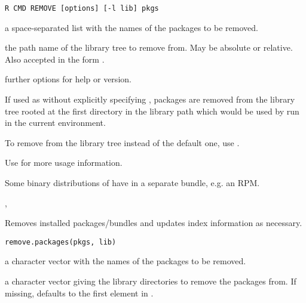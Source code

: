 %
\begin{Usage}
\begin{verbatim}
R CMD REMOVE [options] [-l lib] pkgs
\end{verbatim}
\end{Usage}
%
\begin{Arguments}
\begin{ldescription}
\item[\code{pkgs}] a space-separated list with the names of the packages to
be removed.
\item[\code{lib}] the path name of the \R{} library tree to remove from.  May
be absolute or relative.  Also accepted in the form .
\item[\code{options}] further options for help or version.
\end{ldescription}
\end{Arguments}
%
\begin{Details}\relax
If used as  without explicitly specifying
, packages are removed from the library tree rooted at the
first directory in the library path which would be used by \R{} run in
the current environment.

To remove from the library tree  instead of the default
one, use .

Use  for more usage information.  
\end{Details}
%
\begin{Note}\relax
Some binary distributions of \R{} have  in a separate
bundle, e.g. an  RPM.
\end{Note}
%
\begin{SeeAlso}\relax
{}, 
\end{SeeAlso}
%
\begin{Description}\relax
Removes installed packages/bundles and updates index information
as necessary.
\end{Description}
%
\begin{Usage}
\begin{verbatim}
remove.packages(pkgs, lib)
\end{verbatim}
\end{Usage}
%
\begin{Arguments}
\begin{ldescription}
\item[\code{pkgs}] a character vector with the names of the packages to be removed.
\item[\code{lib}] a character vector giving the library directories to remove the
packages from.  If missing, defaults to the first element in
.
\end{ldescription}
\end{Arguments}
